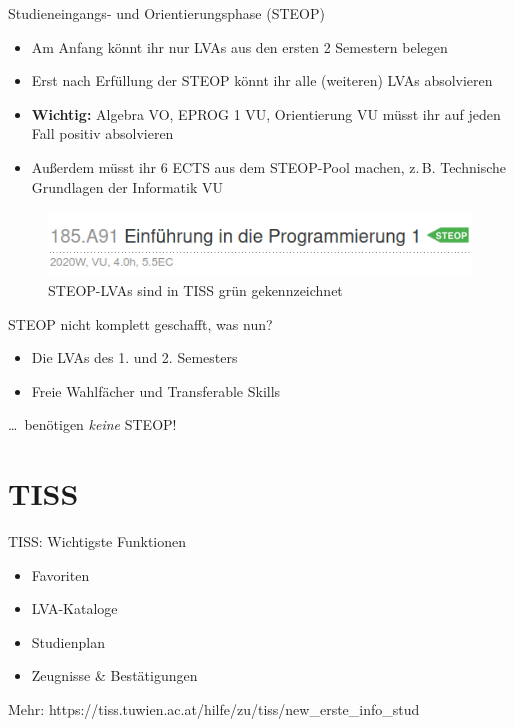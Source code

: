 \documentclass{beamer}
\begin{document}
\begin{frame}{Studieneingangs- und Orientierungsphase (STEOP)}
    \begin{itemize}
        \item Am Anfang könnt ihr nur LVAs aus den ersten 2 Semestern belegen
        \item Erst nach Erfüllung der STEOP könnt ihr alle (weiteren) LVAs
              absolvieren
        \item \textbf{Wichtig:} Algebra VO, EPROG 1 VU, Orientierung VU
              müsst ihr auf jeden Fall positiv absolvieren
        \item Außerdem müsst ihr 6 ECTS aus dem STEOP-Pool machen,
              z.\,B. Technische Grundlagen der Informatik VU
    \end{itemize}
    \begin{figure}[htp]
        \centering
        \includegraphics[width=1\textwidth]{tiss_steop_marker.png}
        \caption{STEOP-LVAs sind in TISS grün gekennzeichnet}
    \end{figure}
\end{frame}

\begin{frame}{STEOP nicht komplett geschafft, was nun?}
    \begin{itemize}
        \item Die LVAs des 1. und 2. Semesters
        \item Freie Wahlfächer und Transferable Skills
    \end{itemize}
    \ldots\ benötigen \textit{keine} STEOP!\\
\end{frame}

\section{TISS}
\begin{frame}{TISS: Wichtigste Funktionen}
    \begin{itemize}
        \item Favoriten
        \item LVA-Kataloge
        \item Studienplan
        \item Zeugnisse \& Bestätigungen
    \end{itemize}
    \vspace{2cm}
    \centering \small Mehr: https://tiss.tuwien.ac.at/hilfe/zu/tiss/new\_erste\_info\_stud
\end{frame}
\end{document}
